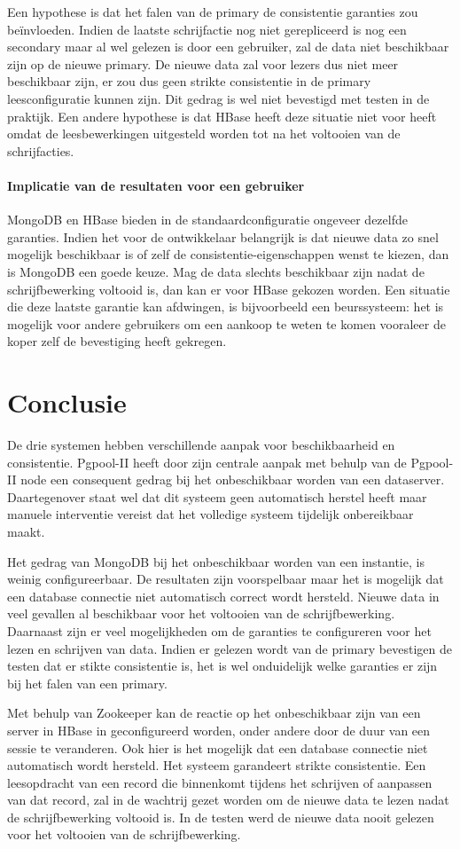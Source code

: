 Een hypothese is dat het falen van de primary de consistentie garanties zou beïnvloeden. Indien de laatste schrijfactie nog niet gerepliceerd is nog een secondary maar al wel gelezen is door een gebruiker, zal de data niet beschikbaar zijn op de nieuwe primary. De nieuwe data zal voor lezers dus niet meer beschikbaar zijn, er zou dus geen strikte consistentie in de primary leesconfiguratie kunnen zijn. Dit gedrag is wel niet bevestigd met testen in de praktijk. Een andere hypothese is dat HBase heeft deze situatie niet voor heeft omdat de leesbewerkingen uitgesteld worden tot na het voltooien van de schrijfacties.

\paragraph{Implicatie van de resultaten voor een gebruiker} MongoDB en HBase bieden in de standaardconfiguratie ongeveer dezelfde garanties. Indien het voor de ontwikkelaar belangrijk is dat nieuwe data zo snel mogelijk beschikbaar is of zelf de consistentie-eigenschappen wenst te kiezen, dan is MongoDB een goede keuze. Mag de data slechts beschikbaar zijn nadat de schrijfbewerking voltooid is, dan kan er voor HBase gekozen worden. Een situatie die deze laatste garantie kan afdwingen, is bijvoorbeeld een beurssysteem: het is mogelijk voor andere gebruikers om een aankoop te weten te komen vooraleer de koper zelf de bevestiging heeft gekregen. 

\section{Conclusie}
De drie systemen hebben verschillende aanpak voor beschikbaarheid en consistentie. Pgpool-II heeft door zijn centrale aanpak met behulp van de Pgpool-II node een consequent gedrag bij het onbeschikbaar worden van een dataserver. Daartegenover staat wel dat dit systeem geen automatisch herstel heeft maar manuele interventie vereist dat het volledige systeem tijdelijk onbereikbaar maakt. 

Het gedrag van MongoDB bij het onbeschikbaar worden van een instantie, is weinig configureerbaar. De resultaten zijn voorspelbaar maar het is mogelijk dat een database connectie niet automatisch correct wordt hersteld. Nieuwe data in veel gevallen al beschikbaar voor het voltooien van de schrijfbewerking. Daarnaast zijn er veel mogelijkheden om de garanties te configureren voor het lezen en schrijven van data. Indien er gelezen wordt van de primary bevestigen de testen dat er stikte consistentie is, het is wel onduidelijk welke garanties er zijn bij het falen van een primary. 

Met behulp van Zookeeper kan de reactie op het onbeschikbaar zijn van een server in HBase in geconfigureerd worden, onder andere door de duur van een sessie te veranderen. Ook hier is het mogelijk dat een database connectie niet automatisch wordt hersteld. Het systeem garandeert strikte consistentie. Een leesopdracht van een record die binnenkomt tijdens het schrijven of aanpassen van dat record, zal in de wachtrij gezet worden om de nieuwe data te lezen nadat de schrijfbewerking voltooid is. In de testen werd de nieuwe data nooit gelezen voor het voltooien van de schrijfbewerking. 